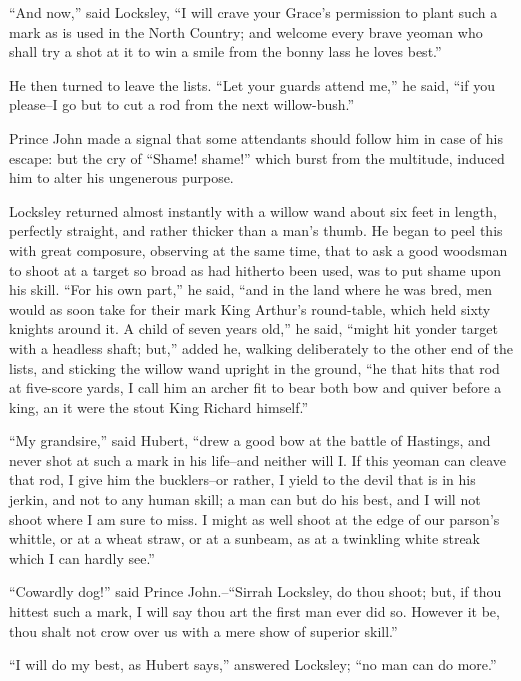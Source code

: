 ``And now,'' said Locksley, ``I will crave your Grace's permission to
plant such a mark as is used in the North Country; and welcome every
brave yeoman who shall try a shot at it to win a smile from the bonny
lass he loves best.''

He then turned to leave the lists. ``Let your guards attend me,'' he
said, ``if you please--I go but to cut a rod from the next
willow-bush.''

Prince John made a signal that some attendants should follow him in case
of his escape: but the cry of ``Shame! shame!'' which burst from the
multitude, induced him to alter his ungenerous purpose.

Locksley returned almost instantly with a willow wand about six feet in
length, perfectly straight, and rather thicker than a man's thumb. He
began to peel this with great composure, observing at the same time,
that to ask a good woodsman to shoot at a target so broad as had
hitherto been used, was to put shame upon his skill. ``For his own
part,'' he said, ``and in the land where he was bred, men would as soon
take for their mark King Arthur's round-table, which held sixty knights
around it. A child of seven years old,'' he said, ``might hit yonder
target with a headless shaft; but,'' added he, walking deliberately to
the other end of the lists, and sticking the willow wand upright in the
ground, ``he that hits that rod at five-score yards, I call him an
archer fit to bear both bow and quiver before a king, an it were the
stout King Richard himself.''

``My grandsire,'' said Hubert, ``drew a good bow at the battle of
Hastings, and never shot at such a mark in his life--and neither will I.
If this yeoman can cleave that rod, I give him the bucklers--or rather,
I yield to the devil that is in his jerkin, and not to any human skill;
a man can but do his best, and I will not shoot where I am sure to miss.
I might as well shoot at the edge of our parson's whittle, or at a wheat
straw, or at a sunbeam, as at a twinkling white streak which I can
hardly see.''

``Cowardly dog!'' said Prince John.--``Sirrah Locksley, do thou shoot;
but, if thou hittest such a mark, I will say thou art the first man ever
did so. However it be, thou shalt not crow over us with a mere show of
superior skill.''

``I will do my best, as Hubert says,'' answered Locksley; ``no man can
do more.''

